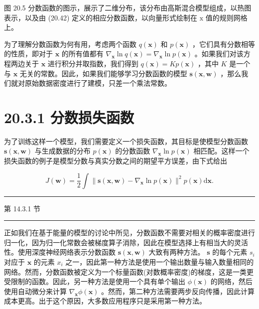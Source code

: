 \documentclass[10pt]{report}
\newcommand{\HRule}{\begin{center}\rule{0.9\linewidth}{0.2mm}\end{center}}
\begin{document}
图 20.5 分数函数的图示，展示了二维分布，该分布由高斯混合模型组成，以热图表示，以及由 (20.42) 定义的相应分数函数，以向量形式绘制在 \(\mathrm{x}\) 值的规则网格上。

为了理解分数函数为何有用，考虑两个函数 \(q\left( \mathbf{x}\right)\) 和 \(p\left( \mathbf{x}\right)\) ，它们具有分数相等的性质，即对于 \(\mathbf{x}\) 的所有值都有 \({\nabla }_{\mathbf{x}}\ln q\left( \mathbf{x}\right)  = {\nabla }_{\mathbf{x}}\ln p\left( \mathbf{x}\right)\) 。如果我们对该方程两边关于 \(\mathbf{x}\) 进行积分并取指数，我们得到 \(q\left( \mathbf{x}\right)  = {Kp}\left( \mathbf{x}\right)\) ，其中 \(K\) 是一个与 \(\mathbf{x}\) 无关的常数。因此，如果我们能够学习分数函数的模型 \(\mathbf{s}\left( {\mathbf{x},\mathbf{w}}\right)\) ，那么我们就对原始数据密度进行了建模，只差一个乘法常数。

\section*{20.3.1 分数损失函数}

为了训练这样一个模型，我们需要定义一个损失函数，其目标是使模型分数函数 \(\mathbf{s}\left( {\mathbf{x},\mathbf{w}}\right)\) 与生成数据的分布 \(p\left( \mathbf{x}\right)\) 的分数函数 \({\nabla }_{\mathbf{x}}\ln p\left( \mathbf{x}\right)\) 相匹配。这样一个损失函数的例子是模型分数与真实分数之间的期望平方误差，由下式给出

\[
J\left( \mathbf{w}\right)  = \frac{1}{2}\int \parallel \mathbf{s}\left( {\mathbf{x},\mathbf{w}}\right)  - {\nabla }_{\mathbf{x}}\ln p\left( \mathbf{x}\right) {\parallel }^{2}p\left( \mathbf{x}\right) \mathrm{d}\mathbf{x}. \tag{20.43}
\]

\HRule

第 14.3.1 节

\HRule

正如我们在基于能量的模型的讨论中所见，分数函数不需要对相关的概率密度进行归一化，因为归一化常数会被梯度算子消除，因此在模型选择上有相当大的灵活性。使用深度神经网络表示分数函数 \(\mathbf{s}\left( {\mathbf{x},\mathbf{w}}\right)\) 大致有两种方法。 \(\mathbf{s}\) 的每个元素 \({s}_{i}\) 对应于 \(\mathbf{x}\) 的元素 \({x}_{i}\) 之一，因此第一种方法是使用一个输出数量与输入数量相同的网络。然而，分数函数被定义为一个标量函数(对数概率密度)的梯度，这是一类更受限制的函数。因此，另一种方法是使用一个具有单个输出 \(\phi \left( \mathbf{x}\right)\) 的网络，然后使用自动微分来计算 \({\nabla }_{\mathbf{x}}\phi \left( \mathbf{x}\right)\) 。然而，第二种方法需要两步反向传播，因此计算成本更高。出于这个原因，大多数应用程序只是采用第一种方法。
\end{document}
